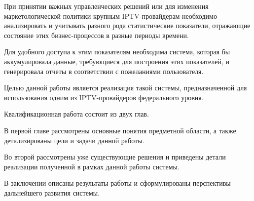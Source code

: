 \vspace{0.5cm}

При принятии важных управленческих решений или для изменения маркетологической политики крупным IPTV-провайдерам 
необходимо анализировать и учитывать разного рода статистические показатели, отражающие состояние этих бизнес-процессов 
в разные периоды времени.

Для удобного доступа к этим показателям необходима система, которая бы аккумулировала данные,
требующиеся для построения этих показателей, и генерировала отчеты в соответствии с пожеланиями пользователя.

Целью данной работы является реализация такой системы, предназначенной для использования одним из IPTV-провайдеров
федерального уровня.

Квалификационная работа состоит из двух глав.

В первой главе рассмотрены основные понятия предметной области, а также детализированы цели и задачи данной работы. 

Во второй рассмотрены уже существующие решения и приведены детали реализации полученной в рамках данной работы системы.

В заключении описаны результаты работы и сформулированы перспективы дальнейшего развития системы.

